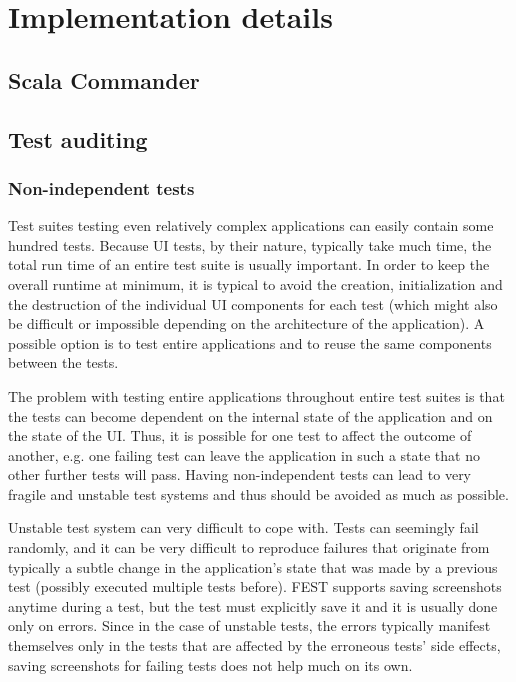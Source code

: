 
\chapter{Implementation details}\label{chap:implementation-details}

\section{Scala Commander}

\section{Test auditing}\label{sec:test-auditing}

\subsection {Non-independent tests}

Test suites testing even relatively complex applications can easily contain some hundred tests. Because UI tests, by their nature, typically take much time, the total run time of an entire test suite is usually important. In order to keep the overall runtime at minimum, it is typical to avoid the creation, initialization and the destruction of the individual UI components for each test (which might also be difficult or impossible depending on the architecture of the application). A possible option is to test entire applications and to reuse the same components between the tests.

The problem with testing entire applications throughout entire test suites is that the tests can become dependent on the internal state of the application and on the state of the UI. Thus, it is possible for one test to affect the outcome of another, e.g. one failing test can leave the application in such a state that no other further tests will pass. Having non-independent tests can lead to very fragile and unstable test systems and thus should be avoided as much as possible.

Unstable test system can very difficult to cope with. Tests can seemingly fail randomly, and it can be very difficult to reproduce failures that originate from typically a subtle change in the application's state that was made by a previous test (possibly executed multiple tests before). FEST supports saving screenshots anytime during a test, but the test must explicitly save it and it is usually done only on errors. Since in the case of unstable tests, the errors typically manifest themselves only in the tests that are affected by the erroneous tests' side effects, saving screenshots for failing tests does not help much on its own.

